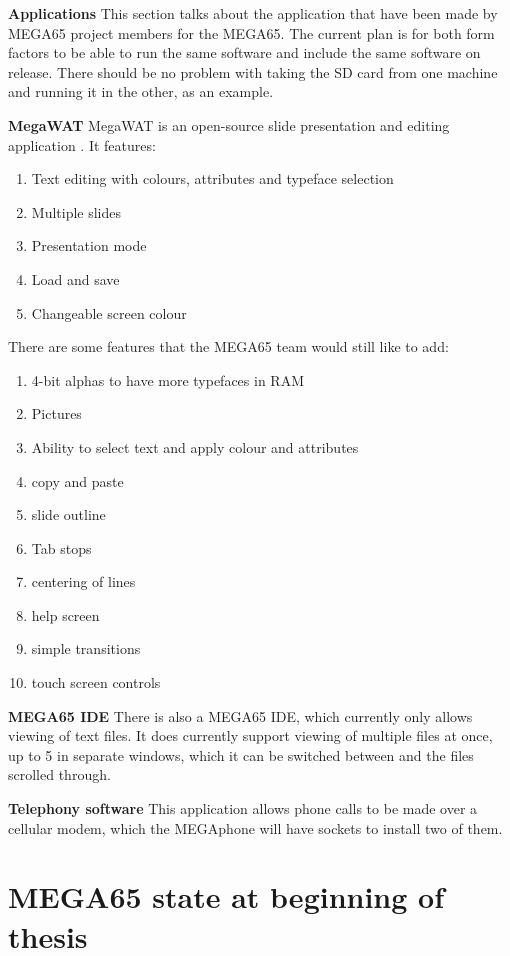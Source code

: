 \textbf{Applications}
This section talks about the application that have been made by MEGA65 project members for the MEGA65. The current plan is for both form factors to be able to run the same software and include the same software on release. There should be no problem with taking the SD card from one machine and running it in the other, as an example.

\textbf{MegaWAT} 
MegaWAT is an open-source slide presentation and editing application \cite{RN163}. It features:
\begin{enumerate}
\item Text editing with colours, attributes and typeface selection
\item Multiple slides
\item Presentation mode
\item Load and save
\item Changeable screen colour
\end{enumerate}
There are some features that the MEGA65 team would still like to add:
\begin{enumerate}
\item 4-bit alphas to have more typefaces in RAM
\item Pictures
\item Ability to select text and apply colour and attributes
\item copy and paste
\item slide outline
\item Tab stops
\item centering of lines
\item help screen
\item simple transitions
\item touch screen controls
\end{enumerate}

\textbf{MEGA65 IDE}
There is also a MEGA65 IDE, which currently only allows viewing of text files. It does currently support viewing of multiple files at once, up to 5 in separate windows, which it can be switched between and the files scrolled through.

\textbf{Telephony software}
This application allows phone calls to be made over a cellular modem, which the MEGAphone will have sockets to install two of them. 

\section{MEGA65 state at beginning of thesis}




